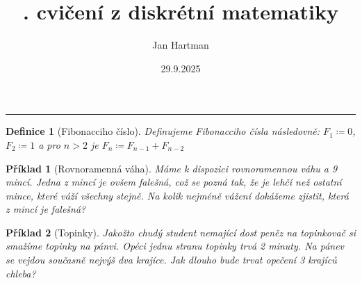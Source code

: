 \documentclass[11pt]{article}
\title{\tutnum. cvičení z diskrétní matematiky}
\author{Jan Hartman}
\date{29.9.2025}
\newcommand{\titlerule}{%
    \noindent %
    \makebox[\textwidth]{\large \thetitle \hfill \thedate}
    \rule{\textwidth}{0.4pt}%
}
\theoremstyle{definitionstyle}
\newtheorem{defn}{Definice}
\theoremstyle{problemstyle}
\newtheorem{problem}{Příklad}
\begin{document}
\titlerule

\begin{defn}[Fibonacciho číslo]
Definujeme Fibonacciho čísla následovně: $F_1 \coloneq 0$, $F_2 \coloneq 1$ a pro $n > 2$ je $F_n \coloneq F_{n-1}+F_{n-2}$
\end{defn}

\begin{problem}[Rovnoramenná váha]
Máme k dispozici rovnoramennou váhu a 9 mincí. Jedna z mincí je ovšem falešná, což se pozná tak, že je lehčí než ostatní mince, které váží všechny stejně. Na kolik nejméně vážení dokážeme zjistit, která z mincí je falešná?
\end{problem}

\begin{problem}[Topinky]
Jakožto chudý student nemající dost peněz na topinkovač si smažíme topinky na pánvi. Opéci jednu stranu topinky trvá 2 minuty. Na pánev se vejdou současně nejvýš dva krajíce. Jak dlouho bude trvat opečení 3 krajíců chleba?
\end{problem}
\end{document}
